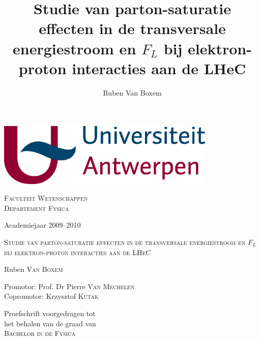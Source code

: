\documentclass[a4paper,11pt]{article}
\title{Studie van parton-saturatie effecten in de transversale energiestroom en $F_L$ bij elektron-proton interacties aan de LHeC}
\author{Ruben Van Boxem}
\numberwithin{equation}{section} %
\begin{document}
\fontsize{12pt}{14pt}\selectfont

\begin{center}

\includegraphics[height=3cm]{Afbeeldingen/UA.eps}

\vspace{1cm}

\fontsize{14pt}{17pt}\selectfont
\textsc{Faculteit Wetenschappen} \\
\textsc{Departement Fysica}
\fontsize{12pt}{14pt}\selectfont
\vspace{0.3cm}

\vspace{1.2cm}

Academiejaar 2009--2010

\vspace{2.8cm}

\fontsize{17.28pt}{21pt}\selectfont

\textsc{Studie van parton-saturatie effecten in de transversale energiestroom en $F_L$ bij elektron-proton interacties aan de LHeC}

\fontsize{12pt}{14pt}\selectfont

\vspace{3cm}

Ruben \textsc{Van Boxem}	

\vspace{2cm}

Promotor: Prof. Dr Pierre \textsc{Van Mechelen}\\
Copromotor: Krzysztof \textsc{Kutak} \\
\vspace{2cm}
\end{center}
Proefschrift voorgedragen tot \\
het behalen van de graad van\\
\textsc{Bachelor in de Fysica}

\thispagestyle{empty}
\newpage
\end{document}
